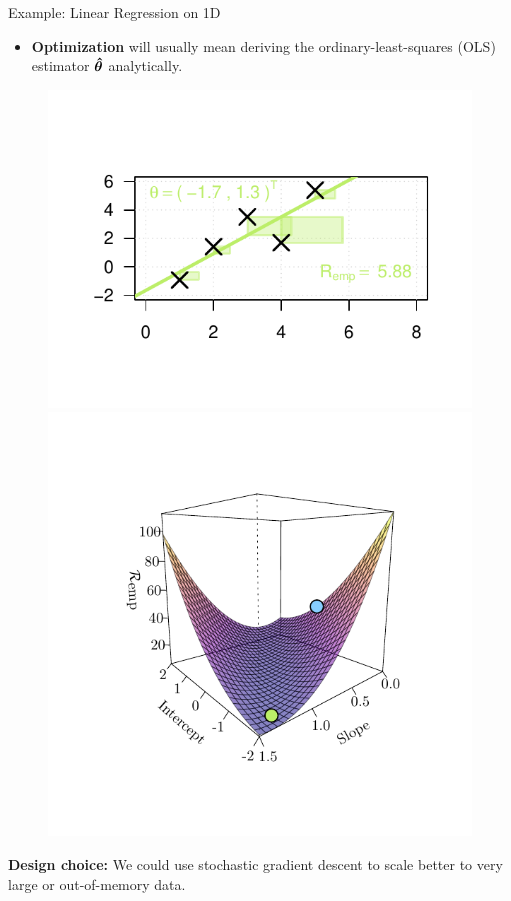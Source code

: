 \documentclass[11pt,compress,t,notes=noshow, xcolor=table]{beamer}
\begin{document}
\begin{vbframe}{Example: Linear Regression on 1D}
  \framebreak
\begin{itemize}  
  \item \textbf{Optimization} will usually mean deriving the 
  ordinary-least-squares (OLS) estimator $\bm{\hat\theta}$ analytically. 
  
    
\end{itemize}
\begin{figure}[!htb]
\includegraphics[trim=1.5cm 1.5cm 1.5cm 1.5cm, width=\linewidth]{figure/lm_reg2}  
\endminipage\hfill
{}
\includegraphics[trim=1.5cm 1.5cm 1.5cm 1.5cm, width=\linewidth]{figure/lm_reg4}
\endminipage
 
\end{figure}
  \textbf{Design choice:} We could use stochastic gradient descent to scale better to very large or out-of-memory data.

\end{vbframe}
\end{document}
